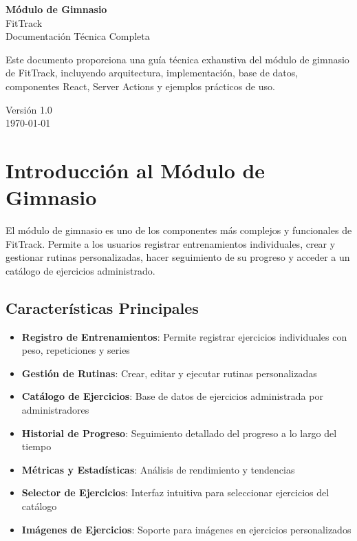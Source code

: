 \documentclass[12pt,a4paper]{article}
\begin{document}
\begin{titlepage}
\centering
\vspace*{2cm}

{\Huge\bfseries Módulo de Gimnasio}\\[0.5cm]
{\LARGE FitTrack}\\[1cm]

{\large Documentación Técnica Completa}\\[2cm]

\begin{minipage}{0.8\textwidth}
\centering
Este documento proporciona una guía técnica exhaustiva del módulo de gimnasio de FitTrack, incluyendo arquitectura, implementación, base de datos, componentes React, Server Actions y ejemplos prácticos de uso.
\end{minipage}

\vfill

{\large Versión 1.0}\\[0.5cm]
{\large \today}

\end{titlepage}

\tableofcontents
\newpage

\section{Introducción al Módulo de Gimnasio}

El módulo de gimnasio es uno de los componentes más complejos y funcionales de FitTrack. Permite a los usuarios registrar entrenamientos individuales, crear y gestionar rutinas personalizadas, hacer seguimiento de su progreso y acceder a un catálogo de ejercicios administrado.

\subsection{Características Principales}

\begin{itemize}
    \item \textbf{Registro de Entrenamientos}: Permite registrar ejercicios individuales con peso, repeticiones y series
    \item \textbf{Gestión de Rutinas}: Crear, editar y ejecutar rutinas personalizadas
    \item \textbf{Catálogo de Ejercicios}: Base de datos de ejercicios administrada por administradores
    \item \textbf{Historial de Progreso}: Seguimiento detallado del progreso a lo largo del tiempo
    \item \textbf{Métricas y Estadísticas}: Análisis de rendimiento y tendencias
    \item \textbf{Selector de Ejercicios}: Interfaz intuitiva para seleccionar ejercicios del catálogo
    \item \textbf{Imágenes de Ejercicios}: Soporte para imágenes en ejercicios personalizados
\end{itemize}
\end{document}
